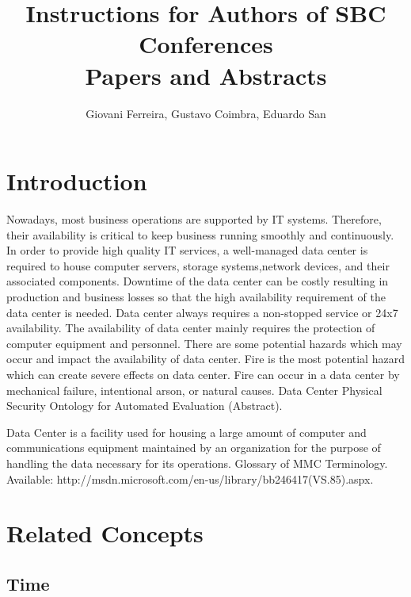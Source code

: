 \documentclass[12pt]{article}
\title{Instructions for Authors of SBC Conferences\\ Papers and Abstracts}
\author{Giovani Ferreira\inst{1}, Gustavo Coimbra\inst{1}, Eduardo San\inst{1} }
\begin{document}
 

\maketitle

\begin{abstract}
\end{abstract}
     
\begin{resumo} 
\end{resumo}


\section{Introduction}

Nowadays, most business operations are supported by IT systems. Therefore, their availability is critical to keep
business running smoothly and continuously. In order to provide high quality IT services, a well-managed data center
is required to house computer servers, storage systems,network devices, and their associated components. Downtime
of the data center can be costly resulting in production and business losses so that the high availability requirement of the
data center is needed.
Data center always requires a non-stopped service or 24x7 availability. The availability of data center mainly requires the
protection of computer equipment and personnel. There are some potential hazards which may occur and impact the
availability of data center. Fire is the most potential hazard which can create severe effects on data center. Fire can occur
in a data center by mechanical failure, intentional arson, or natural causes.
Data Center Physical Security Ontology for Automated Evaluation (Abstract).

Data Center is a facility used for housing a large amount of computer and communications equipment maintained by an
organization for the purpose of handling the data necessary for its operations.
Glossary of MMC Terminology. Available: http://msdn.microsoft.com/en-us/library/bb246417(VS.85).aspx.

\section{Related Concepts}

\subsection{Time}
\end{document}
